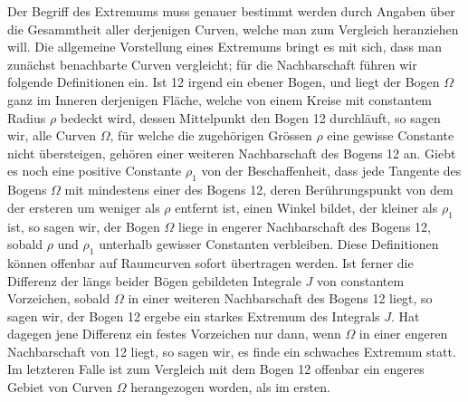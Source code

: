 \documentclass[11pt,a4paper,leqno]{article}
\begin{document}
Der Begriff des Extremums muss genauer bestimmt werden durch Angaben über die Gesammtheit aller derjenigen Curven, welche man zum Vergleich heranziehen will. Die allgemeine Vorstellung eines Extremums bringt es mit sich, dass man zunächst benachbarte Curven vergleicht; für die Nachbarschaft führen wir folgende Definitionen ein. Ist 12 irgend ein ebener Bogen, und liegt der Bogen $\Omega$ ganz im Inneren derjenigen Fläche, welche von einem Kreise mit constantem Radius $\rho$ bedeckt wird, dessen Mittelpunkt den Bogen 12 durchläuft, so sagen wir, alle Curven $\Omega$, für welche die zugehörigen Grössen $\rho$ eine gewisse Constante nicht übersteigen, gehören einer weiteren Nachbarschaft des Bogens 12 an. Giebt es noch eine positive Constante $\rho_1$ von der Beschaffenheit, dass jede Tangente des Bogens $\Omega$ mit mindestens einer des Bogens 12, deren Berührungspunkt von dem der ersteren um weniger als $\rho$ entfernt ist, einen Winkel bildet, der kleiner als $\rho_1$ ist, so sagen wir, der Bogen $\Omega$ liege in engerer Nachbarschaft des Bogens 12, sobald $\rho$ und $\rho_1$ unterhalb gewisser Constanten verbleiben. Diese Definitionen können offenbar auf Raumcurven sofort übertragen werden. Ist ferner die Differenz der längs beider Bögen gebildeten Integrale $J$ von constantem Vorzeichen, sobald $\Omega$ in einer weiteren Nachbarschaft des Bogens 12 liegt, so sagen wir, der Bogen 12 ergebe ein starkes Extremum des Integrals $J$. Hat dagegen jene Differenz ein festes Vorzeichen nur dann, wenn $\Omega$ in einer engeren Nachbarschaft von 12 liegt, so sagen wir, es finde ein schwaches Extremum statt. Im letzteren Falle ist zum Vergleich mit dem Bogen 12 offenbar ein engeres Gebiet von Curven $\Omega$ herangezogen worden, als im ersten.
\end{document}
